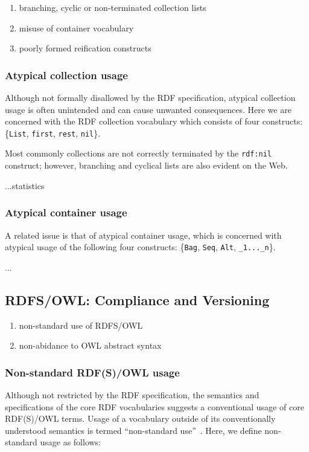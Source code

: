 \documentclass{llncs}
\begin{document}
\begin{enumerate}
\item branching, cyclic or non-terminated collection lists
\item misuse of container vocabulary
\item poorly formed reification constructs
\end{enumerate}


\subsubsection{Atypical collection usage}
Although not formally disallowed by the RDF specification, atypical collection usage is often unintended and can cause unwanted consequences. Here we are concerned with the RDF collection vocabulary which consists of four constructs: \{{\tt List}, {\tt first}, {\tt rest}, {\tt nil}\}. 

Most commonly collections are not correctly terminated by the {\tt rdf:nil} construct; however, branching and cyclical lists are also evident on the Web.

...statistics

\subsubsection{Atypical container usage}
A related issue is that of atypical container usage, which is concerned with atypical usage of the following four constructs: \{{\tt Bag}, {\tt Seq}, {\tt Alt}, {\tt \_1...\_n}\}.

...

\subsection{RDFS/OWL: Compliance and Versioning}
\begin{enumerate}
\item non-standard use of RDFS/OWL
\item non-abidance to OWL abstract syntax
\end{enumerate}

\subsubsection{Non-standard RDF(S)/OWL usage}
Although not restricted by the RDF specification, the semantics and specifications of the core RDF vocabularies suggests a conventional usage of core RDF(S)/OWL terms.
Usage of a vocabulary outside of its conventionally understood semantics is termed ``non-standard use''~\cite{Bruijn-Heymans-LogiFoun-07,muno-etal-2007}.
Here, we define non-standard usage as follows:
\end{document}
